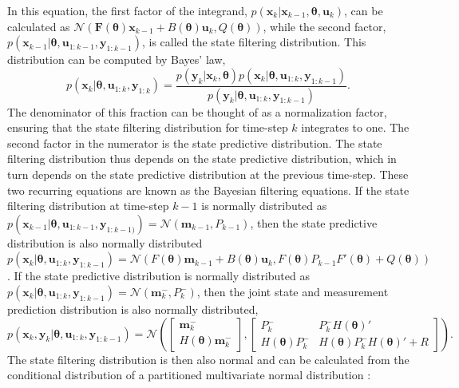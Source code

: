 In this equation, the first factor of the integrand, $p(\bm x_k|\bm x_{k-1}, \bm \theta, \bm u_k)$, can be calculated as $\mathcal{N}(\bm F(\bm \theta)\bm x_{k-1} + B(\bm \theta)\bm u_k, Q(\bm \theta))$, while the second factor, $p(\bm x_{k-1}|\bm \theta, \bm u_{1:k-1},\bm y_{1:k-1})$, is called the state filtering distribution. This distribution can be computed by Bayes' law,
\begin{equation}
p(\bm x_k|\bm \theta, \bm u_{1:k},\bm y_{1:k}) = 
\frac{p(\bm y_k | \bm x_k, \bm \theta)
	p(\bm x_k|\bm \theta, \bm u_{1:k},\bm y_{1:k-1})}
{p(\bm y_k|\bm \theta, \bm u_{1:k},\bm y_{1:k-1})}.
\label{filtering distribution}
\end{equation}
The denominator of this fraction can be thought of as a normalization factor, ensuring that the state filtering distribution for time-step $k$ integrates to one. The second factor in the numerator is the state predictive distribution. The state filtering distribution thus depends on the state predictive distribution, which in turn depends on the state predictive distribution at the previous time-step. These two recurring equations are known as the Bayesian filtering equations. If the state filtering distribution at time-step $k-1$ is normally distributed as $p(\bm x_{k-1}|\bm \theta, \bm u_{1:k-1},\bm y_{1:k-1)}) =  \mathcal{N}(\bm m_{k-1},P_{k-1})$, then the state predictive distribution is also normally distributed $p(\bm x_k|\bm \theta, \bm u_{1:k},\bm y_{1:k-1}) = \mathcal{N}(F(\bm \theta)\bm m_{k-1} + B(\bm \theta)\bm u_k,F(\bm \theta)P_{k-1}F'(\bm \theta) + Q(\bm \theta))$. If the state predictive distribution is normally distributed as $p(\bm x_{k}|\bm \theta, \bm u_{1:k},\bm y_{1:k-1}) = \mathcal{N}(\bm m_{k}^-,P_{k}^-)$, then the joint state and measurement prediction distribution is also normally distributed,
\begin{equation}
p(\bm x_k, \bm y_k|\bm \theta, \bm u_{1:k},\bm y_{1:k-1})  = \mathcal{N} \left (
\begin{bmatrix}
\bm m_{k}^-\\
H(\bm \theta)\bm m_{k}^-
\end{bmatrix},
\begin{bmatrix}
P_{k}^- & P_{k}^-H(\bm \theta)'\\
H(\bm \theta)P_{k}^- & H(\bm \theta)P_{k}^-H(\bm \theta)' + R
\end{bmatrix}
\right ).
\end{equation}
The state filtering distribution is then also normal and can be calculated from the conditional distribution of a partitioned multivariate normal distribution \parencite{von}:
